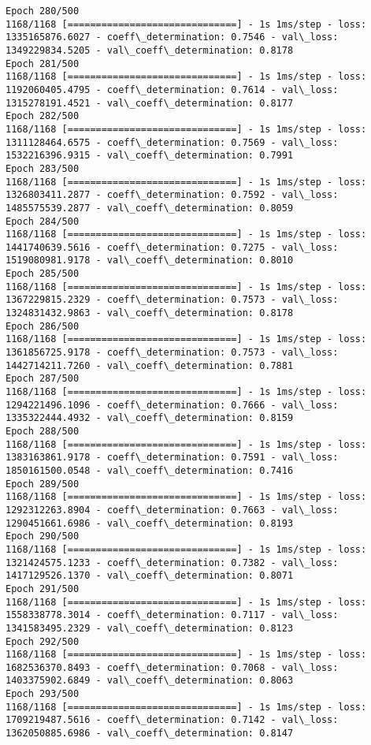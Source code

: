 \documentclass[11pt]{article}
\begin{document}
\begin{Verbatim}[commandchars=\\\{\}]
Epoch 280/500
1168/1168 [==============================] - 1s 1ms/step - loss: 1335165876.6027 - coeff\_determination: 0.7546 - val\_loss: 1349229834.5205 - val\_coeff\_determination: 0.8178
Epoch 281/500
1168/1168 [==============================] - 1s 1ms/step - loss: 1192060405.4795 - coeff\_determination: 0.7614 - val\_loss: 1315278191.4521 - val\_coeff\_determination: 0.8177
Epoch 282/500
1168/1168 [==============================] - 1s 1ms/step - loss: 1311128464.6575 - coeff\_determination: 0.7569 - val\_loss: 1532216396.9315 - val\_coeff\_determination: 0.7991
Epoch 283/500
1168/1168 [==============================] - 1s 1ms/step - loss: 1326803411.2877 - coeff\_determination: 0.7592 - val\_loss: 1485575539.2877 - val\_coeff\_determination: 0.8059
Epoch 284/500
1168/1168 [==============================] - 1s 1ms/step - loss: 1441740639.5616 - coeff\_determination: 0.7275 - val\_loss: 1519080981.9178 - val\_coeff\_determination: 0.8010
Epoch 285/500
1168/1168 [==============================] - 1s 1ms/step - loss: 1367229815.2329 - coeff\_determination: 0.7573 - val\_loss: 1324831432.9863 - val\_coeff\_determination: 0.8178
Epoch 286/500
1168/1168 [==============================] - 1s 1ms/step - loss: 1361856725.9178 - coeff\_determination: 0.7573 - val\_loss: 1442714211.7260 - val\_coeff\_determination: 0.7881
Epoch 287/500
1168/1168 [==============================] - 1s 1ms/step - loss: 1294221496.1096 - coeff\_determination: 0.7666 - val\_loss: 1335322444.4932 - val\_coeff\_determination: 0.8159
Epoch 288/500
1168/1168 [==============================] - 1s 1ms/step - loss: 1383163861.9178 - coeff\_determination: 0.7591 - val\_loss: 1850161500.0548 - val\_coeff\_determination: 0.7416
Epoch 289/500
1168/1168 [==============================] - 1s 1ms/step - loss: 1292312263.8904 - coeff\_determination: 0.7663 - val\_loss: 1290451661.6986 - val\_coeff\_determination: 0.8193
Epoch 290/500
1168/1168 [==============================] - 1s 1ms/step - loss: 1321424575.1233 - coeff\_determination: 0.7382 - val\_loss: 1417129526.1370 - val\_coeff\_determination: 0.8071
Epoch 291/500
1168/1168 [==============================] - 1s 1ms/step - loss: 1558338778.3014 - coeff\_determination: 0.7117 - val\_loss: 1341583495.2329 - val\_coeff\_determination: 0.8123
Epoch 292/500
1168/1168 [==============================] - 1s 1ms/step - loss: 1682536370.8493 - coeff\_determination: 0.7068 - val\_loss: 1403375902.6849 - val\_coeff\_determination: 0.8063
Epoch 293/500
1168/1168 [==============================] - 1s 1ms/step - loss: 1709219487.5616 - coeff\_determination: 0.7142 - val\_loss: 1362050885.6986 - val\_coeff\_determination: 0.8147

\end{Verbatim}
\end{document}
